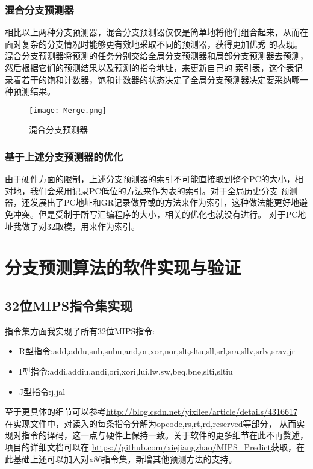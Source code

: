 \documentclass[forprint]{WHUBachelor}
\begin{document}
\subsection{混合分支预测器}
相比以上两种分支预测器，混合分支预测器仅仅是简单地将他们组合起来，从而在面对复杂的分支情况时能够更有效地采取不同的预测器，获得更加优秀
的表现。混合分支预测器将预测的任务分别交给全局分支预测器和局部分支预测器去预测，然后根据它们的预测结果以及预测的指令地址，来更新自己的
索引表，这个表记录着若干的饱和计数器，饱和计数器的状态决定了全局分支预测器决定要采纳哪一种预测结果。
\begin{figure}[ht]
  \centering
    \texttt{[image: Merge.png]}
    \caption{混合分支预测器}
    \label{fig:3}
  \end{figure}

\subsection{基于上述分支预测器的优化}
由于硬件方面的限制，上述分支预测器的索引不可能直接取到整个PC的大小，相对地，我们会采用记录PC低位的方法来作为表的索引。对于全局历史分支
预测器，还发展出了PC地址和GR记录做异或的方法来作为索引，这种做法能更好地避免冲突。但是受制于所写汇编程序的大小，相关的优化也就没有进行。
对于PC地址我做了对32取模，用来作为索引。

  
  \chapter{分支预测算法的软件实现与验证}
  
  \section{32位MIPS指令集实现}
  指令集方面我实现了所有32位MIPS指令:
      
    \begin{itemize}
      \item R型指令:add,addu,sub,subu,and,or,xor,nor,slt,sltu,sll,srl,sra,sllv,srlv,srav,jr
      \item I型指令:addi,addiu,andi,ori,xori,lui,lw,sw,beq,bne,slti,sltiu
      \item J型指令:j,jal
    \end{itemize}
    \par
    至于更具体的细节可以参考\url{http://blog.csdn.net/yixilee/article/details/4316617}
    在实现文件中，对读入的每条指令分解为opcode,rs,rt,rd,reserved等部分，
    从而实现对指令的译码，这一点与硬件上保持一致。关于软件的更多细节在此不再赘述，项目的详细文档可以在
    \url{https://github.com/xiejiangzhao/MIPS_Predict}获取，在此基础上还可以加入对x86指令集，新增其他预测方法的支持。\newpage
  
\end{document}
